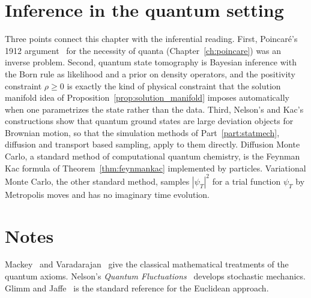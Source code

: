 \section{Inference in the quantum setting}

Three points connect this chapter with the inferential reading. First, Poincar\'e's 1912 argument~\cite{poincare1912quanta} for the necessity of quanta (Chapter~\ref{ch:poincare}) was an inverse problem. Second, quantum state tomography is Bayesian inference with the Born rule as likelihood and a prior on density operators, and the positivity constraint $\rho\geq0$ is exactly the kind of physical constraint that the solution manifold idea of Proposition~\ref{prop:solution_manifold} imposes automatically when one parametrizes the state rather than the data. Third, Nelson's and Kac's constructions show that quantum ground states are large deviation objects for Brownian motion, so that the simulation methods of Part~\ref{part:statmech}, diffusion and transport based sampling, apply to them directly. Diffusion Monte Carlo, a standard method of computational quantum chemistry, is the Feynman Kac formula of Theorem~\ref{thm:feynmankac} implemented by particles. Variational Monte Carlo, the other standard method, samples $|\psi_T|^2$ for a trial function $\psi_T$ by Metropolis moves and has no imaginary time evolution.



\section*{Notes}

Mackey~\cite{mackey1963} and Varadarajan~\cite{varadarajan1985} give the classical mathematical treatments of the quantum axioms. Nelson's \emph{Quantum Fluctuations}~\cite{nelson1985} develops stochastic mechanics. Glimm and Jaffe~\cite{glimmjaffe} is the standard reference for the Euclidean approach.
